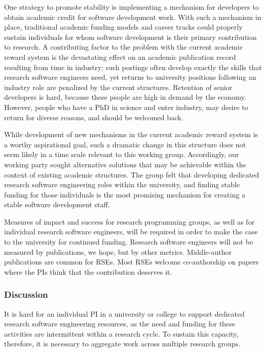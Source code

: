 One strategy to promote stability is implementing a mechanism for developers to
obtain academic credit for software development work. With such a mechanism in
place, traditional academic funding models and career tracks could properly
sustain individuals for whom software development is their primary contribution
to research. A contributing factor to the problem with the current academic
reward system is the devastating effect on an academic publication record
resulting from time in industry; such postings often develop exactly the skills
that research software engineers need, yet returns to university positions
following an industry role are penalized by the current structures. Retention of
senior developers is hard, because these people are high in demand by the
economy. However, people who have a PhD in science and enter industry, may
desire to return for diverse reasons, and should be welcomed back.

While development of new mechanisms in the current academic reward system is a
worthy aspirational goal, such a dramatic change in this structure does not seem
likely in a time scale relevant to this working group. Accordingly, our working
party sought alternative solutions that may be achievable within the context of
existing academic structures. The group felt that developing dedicated research
software engineering roles within the university, and finding stable funding for
those individuals is the most promising mechanism for creating a stable software
development staff.

Measures of impact and success for research programming groups, as well as for
individual research software engineers, will be required in order to make the
case to the university for continued funding. Research software engineers will
not be measured by publications, we hope, but by other metrics. Middle-author
publications are common for RSEs. Most RSEs welcome co-authorship on papers
where the PIs think that the contribution deserves it.

\subsubsection{Discussion}

It is hard for an individual PI in a university or college to support dedicated
research software engineering resources, as the need and funding for these
activities are intermittent within a research cycle. To sustain this capacity,
therefore, it is necessary to aggregate work across multiple research
groups.

